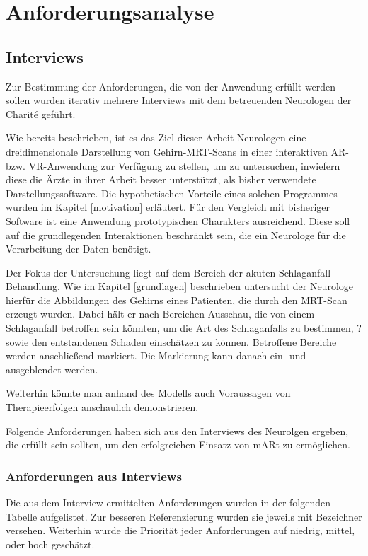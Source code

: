 
\chapter{Anforderungsanalyse}
\label{anforderung}

\section{Interviews}

Zur Bestimmung der Anforderungen, die von der Anwendung erfüllt werden sollen wurden iterativ mehrere Interviews mit dem betreuenden Neurologen der Charité geführt.

Wie bereits beschrieben, ist es das Ziel dieser Arbeit Neurologen eine dreidimensionale Darstellung von Gehirn-MRT-Scans in einer interaktiven AR- bzw. VR-Anwendung zur Verfügung zu stellen, um zu untersuchen, inwiefern diese die Ärzte in ihrer Arbeit besser unterstützt, als bisher verwendete Darstellungssoftware. Die hypothetischen Vorteile eines solchen Programmes wurden im Kapitel \ref{motivation} erläutert.
Für den Vergleich mit bisheriger Software ist eine Anwendung prototypischen Charakters ausreichend. Diese soll auf die grundlegenden Interaktionen beschränkt sein, die ein Neurologe für die Verarbeitung der Daten benötigt.

Der Fokus der Untersuchung liegt auf dem Bereich der akuten Schlaganfall Behandlung. Wie im Kapitel \ref{grundlagen} beschrieben untersucht der Neurologe hierfür die Abbildungen des Gehirns eines Patienten, die durch den MRT-Scan erzeugt wurden. Dabei hält er nach Bereichen Ausschau, die von einem Schlaganfall betroffen sein könnten, um die Art des Schlaganfalls zu bestimmen, ? sowie den entstandenen Schaden einschätzen zu können. Betroffene Bereiche werden anschließend markiert. Die Markierung kann danach ein- und ausgeblendet werden.

Weiterhin könnte man anhand des Modells auch Voraussagen von Therapieerfolgen anschaulich demonstrieren.

Folgende Anforderungen haben sich aus den Interviews des Neurolgen ergeben, die erfüllt sein sollten, um den erfolgreichen Einsatz von mARt zu ermöglichen.

\subsection{Anforderungen aus Interviews}
Die aus dem Interview ermittelten Anforderungen wurden in der folgenden Tabelle aufgelistet. Zur besseren Referenzierung wurden sie jeweils mit Bezeichner versehen. Weiterhin wurde die Priorität jeder Anforderungen auf niedrig, mittel, oder hoch geschätzt.

